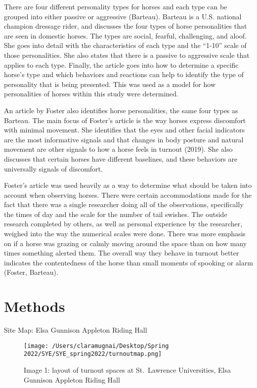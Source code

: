 \documentclass[
]{article}
\begin{document}
There are four different personality types for horses and each type can
be grouped into either passive or aggressive (Barteau). Barteau is a
U.S. national champion dressage rider, and discusses the four types of
horse personalities that are seen in domestic horses. The types are
social, fearful, challenging, and aloof. She goes into detail with the
characteristics of each type and the ``1-10'' scale of those
personalities. She also states that there is a passive to aggressive
scale that applies to each type. Finally, the article goes into how to
determine a specific horse's type and which behaviors and reactions can
help to identify the type of personality that is being presented. This
was used as a model for how personalities of horses within this study
were determined.

An article by Foster also identifies horse personalities, the same four
types as Barteau. The main focus of Foster's article is the way horses
express discomfort with minimal movement. She identifies that the eyes
and other facial indicators are the most informative signals and that
changes in body posture and natural movement are other signals to how a
horse feels in turnout (2019). She also discusses that certain horses
have different baselines, and these behaviors are universally signals of
discomfort.

Foster's article was used heavily as a way to determine what should be
taken into account when observing horses. There were certain
accommodations made for the fact that there was a single researcher
doing all of the observations, specifically the times of day and the
scale for the number of tail swishes. The outside research completed by
others, as well as personal experience by the researcher, weighed into
the way the numerical scales were done. There was more emphasis on if a
horse was grazing or calmly moving around the space than on how many
times something alerted them. The overall way they behave in turnout
better indicates the contentedness of the horse than small moments of
spooking or alarm (Foster, Barteau).

\hypertarget{methods}{%
\section{Methods}\label{methods}}

Site Map: Elsa Gunnison Appleton Riding Hall

\begin{figure}
\centering
\texttt{[image: /Users/claramugnai/Desktop/Spring 2022/SYE/SYE\_spring2022/turnoutmap.png]}
\caption{Image 1: layout of turnout spaces at St.~Lawrence Universities,
Elsa Gunnison Appleton Riding Hall}
\end{figure}
\end{document}
